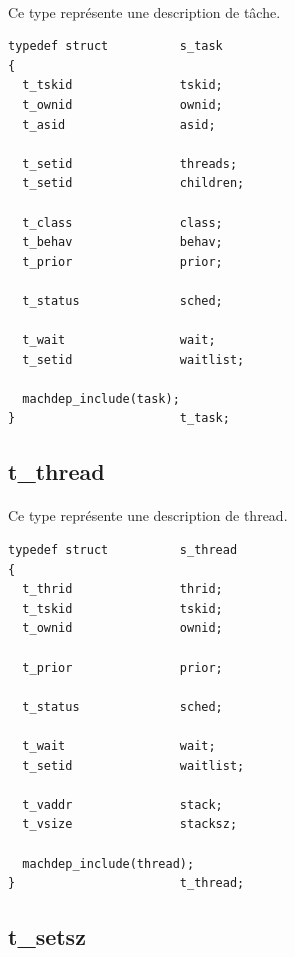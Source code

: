 \documentclass[10pt,a4wide]{article}
\begin{document}
\paragraph{}

Ce type repr\'esente une description de t\^ache.

\begin{verbatim}
typedef struct          s_task
{
  t_tskid               tskid;
  t_ownid               ownid;
  t_asid                asid;

  t_setid               threads;
  t_setid               children;

  t_class               class;
  t_behav               behav;
  t_prior               prior;

  t_status              sched;

  t_wait                wait;
  t_setid               waitlist;

  machdep_include(task);
}                       t_task;
\end{verbatim}

\subsection{t\_thread}

\paragraph{}

Ce type repr\'esente une description de thread.

\begin{verbatim}
typedef struct          s_thread
{
  t_thrid               thrid;
  t_tskid               tskid;
  t_ownid               ownid;

  t_prior               prior;

  t_status              sched;

  t_wait                wait;
  t_setid               waitlist;

  t_vaddr               stack;
  t_vsize               stacksz;

  machdep_include(thread);
}                       t_thread;
\end{verbatim}

\subsection{t\_setsz}

\paragraph{}
\end{document}
